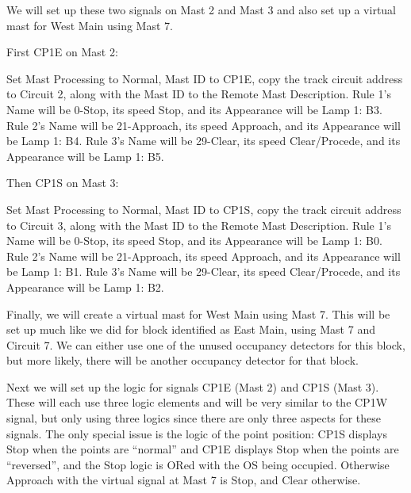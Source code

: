 We will set up these two signals on Mast 2 and Mast 3 and also set up a 
virtual mast for West Main using Mast 7.

First CP1E on Mast 2:

Set Mast Processing to Normal, Mast ID to CP1E, copy the track circuit address 
to Circuit 2, along with the Mast ID to the Remote Mast Description. Rule 1's
Name will be 0-Stop, its speed Stop, and its Appearance will be Lamp 1: B3.
Rule 2's Name will be 21-Approach, its speed Approach, and its Appearance will 
be Lamp 1: B4. Rule 3's Name will be 29-Clear, its speed Clear/Procede, and 
its Appearance will be Lamp 1: B5.

Then CP1S on Mast 3:

Set Mast Processing to Normal, Mast ID to CP1S, copy the track circuit address 
to Circuit 3, along with the Mast ID to the Remote Mast Description. Rule 1's
Name will be 0-Stop, its speed Stop, and its Appearance will be Lamp 1: B0.
Rule 2's Name will be 21-Approach, its speed Approach, and its Appearance will 
be Lamp 1: B1. Rule 3's Name will be 29-Clear, its speed Clear/Procede, and 
its Appearance will be Lamp 1: B2.

Finally, we will create a virtual mast for West Main using Mast 7.  This will 
be set up much like we did for block identified as East Main, using Mast 7 and 
Circuit 7.  We can either use one of the unused occupancy detectors for this 
block, but more likely, there will be another occupancy detector for that 
block.

Next we will set up the logic for signals CP1E (Mast 2) and CP1S (Mast 3).  
These will each use three logic elements and will be very similar to the CP1W 
signal, but only using three logics since there are only three aspects for 
these signals.  The only special issue is the logic of the point position: 
CP1S displays Stop when the points are ``normal'' and CP1E displays Stop when 
the points are ``reversed'', and the Stop logic is ORed with the OS being 
occupied. Otherwise Approach with the virtual signal at Mast 7 is Stop, and 
Clear otherwise.

